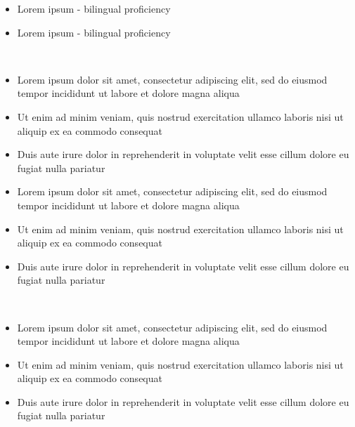 \documentclass{resume_template}
\begin{document}
\begin{tcbraster}[grid]
\begin{tcolorbox}[sidebar,raster multicolumn=2]
				\begin{itemize}
					\item Lorem ipsum - bilingual proficiency
					\item Lorem ipsum - bilingual proficiency
				\end{itemize}
		\end{tcolorbox}
		\begin{tcolorbox}[main,raster multicolumn=4]
			\justifying
			\\
				\begin{itemize}
					\item Lorem ipsum dolor sit amet, consectetur adipiscing elit, sed do eiusmod tempor incididunt ut labore et dolore magna aliqua
					\item Ut enim ad minim veniam, quis nostrud exercitation ullamco laboris nisi ut aliquip ex ea commodo consequat
					\item Duis aute irure dolor in reprehenderit in voluptate velit esse cillum dolore eu fugiat nulla pariatur
				\end{itemize}
				\vspace*{12pt}
				\begin{itemize}
					\item Lorem ipsum dolor sit amet, consectetur adipiscing elit, sed do eiusmod tempor incididunt ut labore et dolore magna aliqua
					\item Ut enim ad minim veniam, quis nostrud exercitation ullamco laboris nisi ut aliquip ex ea commodo consequat
					\item Duis aute irure dolor in reprehenderit in voluptate velit esse cillum dolore eu fugiat nulla pariatur
				\end{itemize}
						
			\\
				\begin{itemize}
					\item Lorem ipsum dolor sit amet, consectetur adipiscing elit, sed do eiusmod tempor incididunt ut labore et dolore magna aliqua
					\item Ut enim ad minim veniam, quis nostrud exercitation ullamco laboris nisi ut aliquip ex ea commodo consequat
					\item Duis aute irure dolor in reprehenderit in voluptate velit esse cillum dolore eu fugiat nulla pariatur
				\end{itemize}
			

\end{tcolorbox}
\end{tcbraster}
\end{document}
